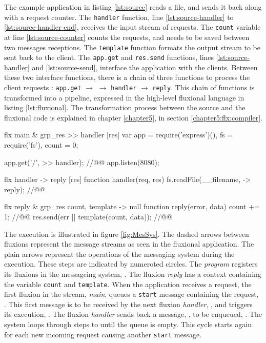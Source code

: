 The example application in listing \ref{lst:source} reads a file, and sends it back along with a request counter.
The \texttt{handler} function, line \ref{lst:source-handler} to \ref{lst:source-handler-end}, receives the input stream of requests.
The \texttt{count} variable at line \ref{lst:source-counter} counts the requests, and needs to be saved between two messages receptions.
The \texttt{template} function formats the output stream to be sent back to the client.
The \texttt{app.get} and \texttt{res.send} functions, lines \ref{lst:source-handler} and \ref{lst:source-send}, interface the application with the clients.
Between these two interface functions, there is a chain of three functions to process the client requests : \texttt{app.get} $\to$ \hspace{-1.4em} $\to$ \texttt{handler} $\to$ \texttt{reply}.
This chain of functions is transformed into a pipeline, expressed in the high-level fluxional language in listing \ref{lst:fluxional}.
The transformation process between the source and the fluxional code is explained in chapter \ref{chapter5}, in section \ref{chapter5:flx:compiler}.

\begin{code}[flx, caption={Example application expressed in the high-level fluxional language}, label={lst:fluxional}]
flx main & grp_res
>> handler [res]
  var app = require('express')(),
      fs = require('fs'),
      count = 0;

  app.get('/', >> handler); //@\label{lst:fluxional-streamtohandler}@
  app.listen(8080);

flx handler
-> reply [res]
  function handler(req, res) {
    fs.readFile(__filename, -> reply); //@\label{lst:fluxional-readfile}@
  }

flx reply & grp_res {count, template}
-> null
  function reply(error, data) {
    count += 1; //@\label{lst:fluxional-counter}@
    res.send(err || template(count, data)); //@\label{lst:fluxional-ressend}@
  }
\end{code}

The execution is illustrated in figure \ref{fig:MesSys}.
The dashed arrows between fluxions represent the message streams as seen in the fluxional application.
The plain arrows represent the operations of the messaging system during the execution.
These steps are indicated by numeroted circles.
The \textit{program} registers its fluxions in the messageing system, .
The fluxion \textit{reply} has a context containing the variable \texttt{count} and \texttt{tem\-plate}.
When the application receives a request, the first fluxion in the stream, \textit{main}, queues a \texttt{start} message containing the request, .
This first message is to be received by the next fluxion \textit{handler}, , and triggers its execution, .
The fluxion \textit{handler} sends back a message, , to be enqueued, .
The system loops through steps  to  until the queue is empty.
This cycle starts again for each new incoming request causing another \texttt{start} message.

